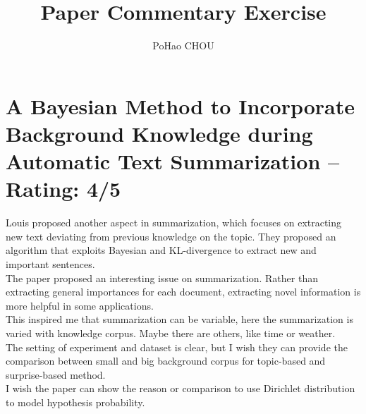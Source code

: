 \documentclass[a4paper]{article}
\title{Paper Commentary Exercise}
\author{PoHao CHOU}
\begin{document}
\maketitle
\section{A Bayesian Method to Incorporate Background Knowledge during Automatic Text Summarization -- Rating: 4/5}
Louis \cite{P14-2055} proposed another aspect in summarization, which focuses on extracting new text deviating from previous knowledge on the topic. They proposed an algorithm that exploits Bayesian and KL-divergence to extract new and important sentences.\\

The paper proposed an interesting issue on summarization. Rather than extracting general importances for each document, extracting novel information is more helpful in some applications.\\

This inspired me that summarization can be variable, here the summarization is varied with knowledge corpus. Maybe there are others, like time or weather.\\ 

The setting of experiment and dataset is clear, but I wish they can provide the comparison between small and big background corpus for topic-based and surprise-based method.\\

I wish the paper can show the reason or comparison to use Dirichlet distribution to model hypothesis probability.




\end{document}
